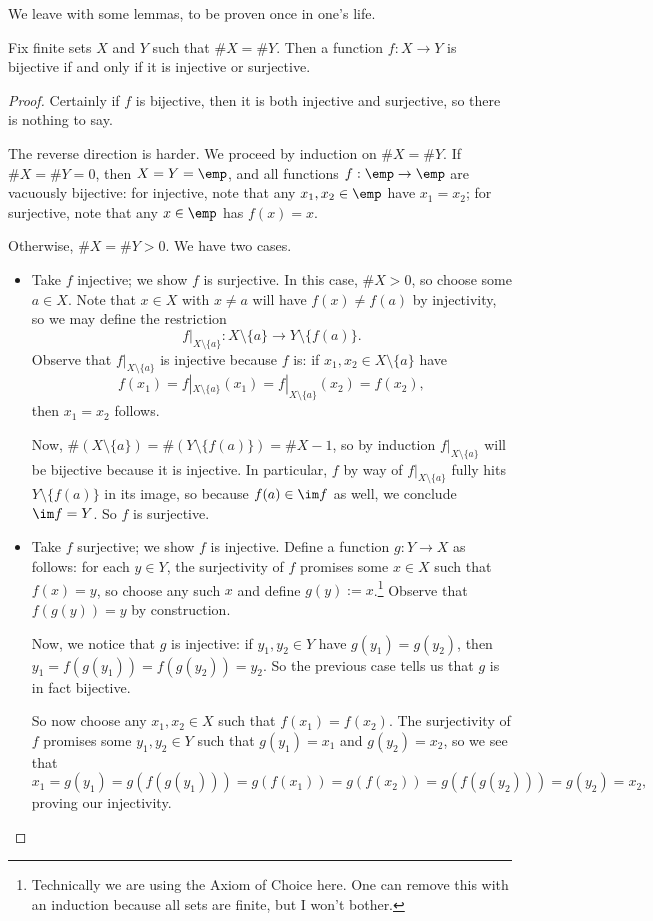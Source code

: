 We leave with some lemmas, to be proven once in one's life.
\begin{lemma}
	Fix finite sets $X$ and $Y$ such that $\#X=\#Y$. Then a function $f:X\to Y$ is bijective if and only if it is injective or surjective.
\end{lemma}
\begin{proof}
	Certainly if $f$ is bijective, then it is both injective and surjective, so there is nothing to say.
	
	The reverse direction is harder. We proceed by induction on $\#X=\#Y$. If $\#X=\#Y=0$, then $X=Y=\emp$, and all functions $f:\emp\to\emp$ are vacuously bijective: for injective, note that any $x_1,x_2\in\emp$ have $x_1=x_2$; for surjective, note that any $x\in\emp$ has $f(x)=x$.

	Otherwise, $\#X=\#Y>0$. We have two cases.
	\begin{itemize}
		\item Take $f$ injective; we show $f$ is surjective. In this case, $\#X>0$, so choose some $a\in X$. Note that $x\in X$ with $x\ne a$ will have $f(x)\ne f(a)$ by injectivity, so we may define the restriction
		\[f|_{X\setminus\{a\}}:X\setminus\{a\}\to Y\setminus\{f(a)\}.\]
		Observe that $f|_{X\setminus\{a\}}$ is injective because $f$ is: if $x_1,x_2\in X\setminus\{a\}$ have
		\[f(x_1)=f|_{X\setminus\{a\}}(x_1)=f|_{X\setminus\{a\}}(x_2)=f(x_2),\]
		then $x_1=x_2$ follows.
		
		Now, $\#(X\setminus\{a\})=\#(Y\setminus\{f(a)\})=\#X-1$, so by induction $f|_{X\setminus\{a\}}$ will be bijective because it is injective. In particular, $f$ by way of $f|_{X\setminus\{a\}}$ fully hits $Y\setminus\{f(a)\}$ in its image, so because $f(a)\in\im f$ as well, we conclude $\im f=Y$. So $f$ is surjective.

		\item Take $f$ surjective; we show $f$ is injective. Define a function $g:Y\to X$ as follows: for each $y\in Y$, the surjectivity of $f$ promises some $x\in X$ such that $f(x)=y$, so choose any such $x$ and define $g(y):=x$.\footnote{Technically we are using the Axiom of Choice here. One can remove this with an induction because all sets are finite, but I won't bother.} Observe that $f(g(y))=y$ by construction.

		Now, we notice that $g$ is injective: if $y_1,y_2\in Y$ have $g(y_1)=g(y_2)$, then $y_1=f(g(y_1))=f(g(y_2))=y_2$. So the previous case tells us that $g$ is in fact bijective.

		So now choose any $x_1,x_2\in X$ such that $f(x_1)=f(x_2)$. The surjectivity of $f$ promises some $y_1,y_2\in Y$ such that $g(y_1)=x_1$ and $g(y_2)=x_2$, so we see that
		\[x_1=g(y_1)=g(f(g(y_1)))=g(f(x_1))=g(f(x_2))=g(f(g(y_2)))=g(y_2)=x_2,\]
		proving our injectivity.
		\qedhere
	\end{itemize}
\end{proof}
